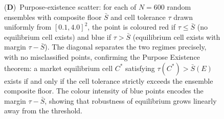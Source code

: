 \begin{figure}[!htbp]
{    (\textbf{D})~Purpose-existence scatter: for each of $N = 600$ random ensembles with composite floor $\bar{S}$ and cell tolerance $\tau$ drawn uniformly from $[0.1, 4.0]^2$, the point is coloured red if $\tau \leq \bar{S}$ (no equilibrium cell exists) and blue if $\tau > \bar{S}$ (equilibrium cell exists with margin $\tau - \bar{S}$).  The diagonal separates the two regimes precisely, with no misclassified points, confirming the Purpose Existence theorem: a market equilibrium cell $C^*$ satisfying $\tau(C^*) > \bar{S}(E)$ exists if and only if the cell tolerance strictly exceeds the ensemble composite floor.  The colour intensity of blue points encodes the margin $\tau - \bar{S}$, showing that robustness of equilibrium grows linearly away from the threshold.}
    \label{fig:market_panel_4}
\end{figure}


